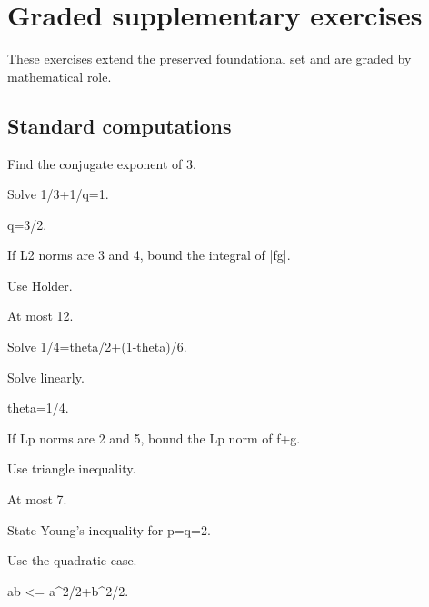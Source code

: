 \section{Graded supplementary exercises}
These exercises extend the preserved foundational set and are graded by mathematical role.

\subsection*{Standard computations}

\begin{exercise}[Conjugate]\label{exr:iii07-expand-01}
Find the conjugate exponent of 3.
\end{exercise}
\begin{hint}
Solve 1/3+1/q=1.
\end{hint}
\begin{solution}
q=3/2.
\end{solution}

\begin{exercise}\label{exr:iii07-expand-02}
If L2 norms are 3 and 4, bound the integral of |fg|.
\end{exercise}
\begin{hint}
Use Holder.
\end{hint}
\begin{solution}
At most 12.
\end{solution}

\begin{exercise}[Interpolation]\label{exr:iii07-expand-03}
Solve 1/4=theta/2+(1-theta)/6.
\end{exercise}
\begin{hint}
Solve linearly.
\end{hint}
\begin{solution}
theta=1/4.
\end{solution}

\begin{exercise}[Minkowski]\label{exr:iii07-expand-04}
If Lp norms are 2 and 5, bound the Lp norm of f+g.
\end{exercise}
\begin{hint}
Use triangle inequality.
\end{hint}
\begin{solution}
At most 7.
\end{solution}

\begin{exercise}[Young p=2]\label{exr:iii07-expand-05}
State Young's inequality for p=q=2.
\end{exercise}
\begin{hint}
Use the quadratic case.
\end{hint}
\begin{solution}
ab <= a\textasciicircum{}2/2+b\textasciicircum{}2/2.
\end{solution}


